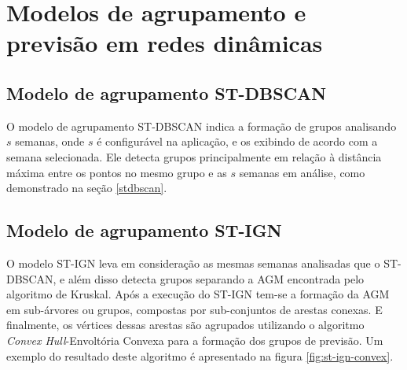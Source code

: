 \chapter{Modelos de agrupamento e previsão em redes dinâmicas}
\label{chap:modelo-agrupamento}

\section{Modelo de agrupamento ST-DBSCAN}
O modelo de agrupamento \acrshort{ST-DBSCAN} indica a formação de grupos analisando ${s}$ semanas, onde ${s}$ é configurável na aplicação, e os exibindo de acordo com a semana selecionada. Ele detecta grupos principalmente em relação à distância máxima entre os pontos no mesmo grupo e as ${s}$ semanas em análise, como demonstrado na seção \ref{stdbscan}.

\section{Modelo de agrupamento ST-IGN}
\label{sec:modelo-st-ign}
O modelo \acrshort{ST-IGN} leva em consideração as mesmas semanas analisadas que o \acrshort{ST-DBSCAN}, e além disso detecta grupos separando a \acrshort{AGM} encontrada pelo algoritmo de Kruskal. Após a execução do \acrshort{ST-IGN} tem-se a formação da \acrshort{AGM} em sub-árvores ou grupos, compostas por sub-conjuntos de arestas conexas. E finalmente, os vértices dessas arestas são agrupados utilizando o algoritmo \emph{Convex Hull}-Envoltória Convexa para a formação dos grupos de previsão. Um exemplo do resultado deste algoritmo é apresentado na figura \ref{fig:st-ign-convex}.

\begin{figure}[!ht]
	\centering	
\end{figure}
\FloatBarrier

